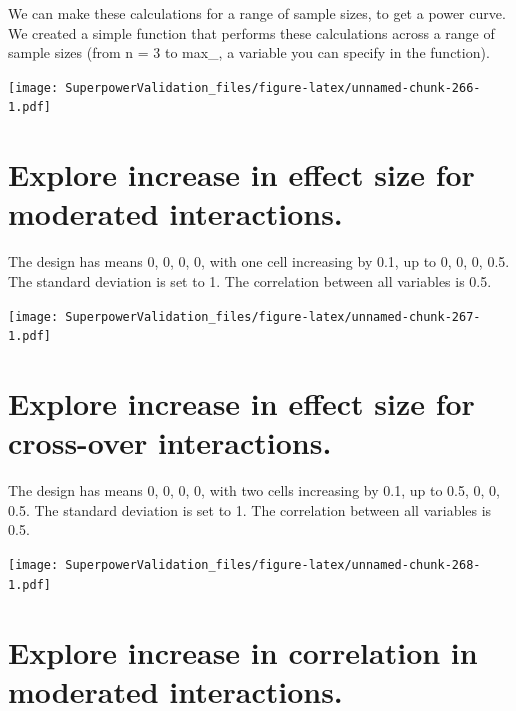 \documentclass[]{book}
\newenvironment{Shaded}{\begin{snugshade}}{\end{snugshade}}
\newcommand{\DataTypeTok}[1]{\textcolor[rgb]{0.13,0.29,0.53}{#1}}
\newcommand{\DecValTok}[1]{\textcolor[rgb]{0.00,0.00,0.81}{#1}}
\newcommand{\KeywordTok}[1]{\textcolor[rgb]{0.13,0.29,0.53}{\textbf{#1}}}
\newcommand{\NormalTok}[1]{#1}
\newcommand{\OperatorTok}[1]{\textcolor[rgb]{0.81,0.36,0.00}{\textbf{#1}}}
\newcommand{\StringTok}[1]{\textcolor[rgb]{0.31,0.60,0.02}{#1}}
\begin{document}
We can make these calculations for a range of sample sizes, to get a power curve. We created a simple function that performs these calculations across a range of sample sizes (from n = 3 to max\_, a variable you can specify in the function).

\begin{Shaded}
\end{Shaded}

\texttt{[image: SuperpowerValidation\_files/figure-latex/unnamed-chunk-266-1.pdf]}

\hypertarget{explore-increase-in-effect-size-for-moderated-interactions.}{%
\section{Explore increase in effect size for moderated interactions.}\label{explore-increase-in-effect-size-for-moderated-interactions.}}

The design has means 0, 0, 0, 0, with one cell increasing by 0.1, up to 0, 0, 0, 0.5. The standard deviation is set to 1. The correlation between all variables is 0.5.

\texttt{[image: SuperpowerValidation\_files/figure-latex/unnamed-chunk-267-1.pdf]}

\hypertarget{explore-increase-in-effect-size-for-cross-over-interactions.}{%
\section{Explore increase in effect size for cross-over interactions.}\label{explore-increase-in-effect-size-for-cross-over-interactions.}}

The design has means 0, 0, 0, 0, with two cells increasing by 0.1, up to 0.5, 0, 0, 0.5. The standard deviation is set to 1. The correlation between all variables is 0.5.

\texttt{[image: SuperpowerValidation\_files/figure-latex/unnamed-chunk-268-1.pdf]}

\hypertarget{explore-increase-in-correlation-in-moderated-interactions.}{%
\section{Explore increase in correlation in moderated interactions.}\label{explore-increase-in-correlation-in-moderated-interactions.}}
\end{document}

